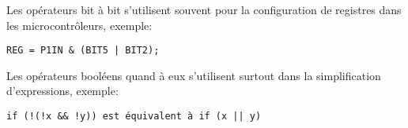 Les opérateurs bit à bit s'utilisent souvent pour la configuration de registres dans les microcontrôleurs, exemple:

\lstset{style=customc}
\begin{lstlisting}
REG = P1IN & (BIT5 | BIT2);
\end{lstlisting}

Les opérateurs booléens quand à eux s'utilisent surtout dans la simplification d'expressions, exemple:

\lstset{style=customc}
\begin{lstlisting}
if (!(!x && !y)) est équivalent à if (x || y)
\end{lstlisting}

%
%
%
